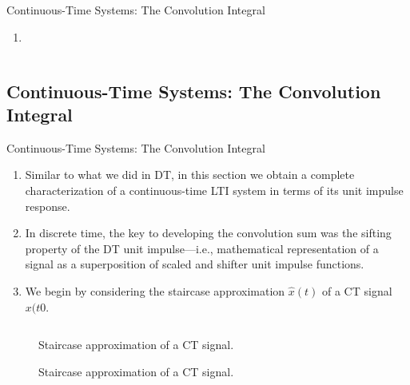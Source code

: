 \begin{frame}{Continuous-Time Systems: The Convolution Integral}
    \begin{enumerate}
        \item
    \end{enumerate}

    {
        \begin{columns}
        \end{columns}
    }
\end{frame}


\subsection{Continuous-Time Systems: The Convolution Integral}

\begin{frame}{Continuous-Time Systems: The Convolution Integral}
    \begin{enumerate}
        \item Similar to what we did in DT, in this section we obtain a complete characterization of a continuous-time LTI system in terms of its unit impulse response.
        \item In discrete time, the key to developing the convolution sum was the sifting property of the DT unit impulse---i.e., mathematical representation of a signal as  a superposition of scaled and shifter unit impulse functions.
        \item We begin by considering the staircase approximation $\hat{x}(t)$ of a CT signal $x(t0$.
    \end{enumerate}

    {
        \begin{columns}
        \end{columns}
    }
\end{frame}

\begin{frame}[plain,t]
    {
    \begin{figure}
      \centering
      
      \caption{Staircase approximation of a CT signal.}\label{fi:ct_sifting}
    \end{figure}
    }
    {
    \begin{figure}
      \centering
      
      \caption{Staircase approximation of a CT signal.}\label{fi:ct_sifting_handout}
    \end{figure}
    }
\end{frame}



